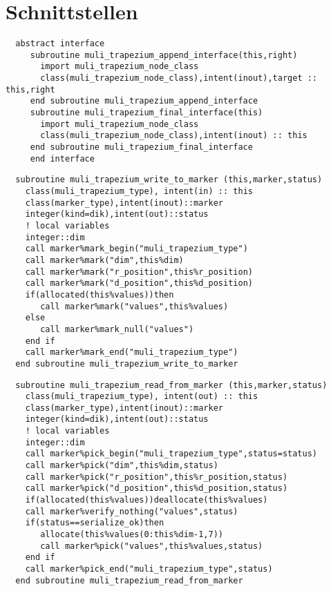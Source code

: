 \section{Schnittstellen}
\begin{Verbatim}
  abstract interface
     subroutine muli_trapezium_append_interface(this,right)
       import muli_trapezium_node_class
       class(muli_trapezium_node_class),intent(inout),target :: this,right
     end subroutine muli_trapezium_append_interface
     subroutine muli_trapezium_final_interface(this)
       import muli_trapezium_node_class
       class(muli_trapezium_node_class),intent(inout) :: this
     end subroutine muli_trapezium_final_interface
     end interface
   \end{Verbatim}
   \Methods
   \begin{Verbatim}
  subroutine muli_trapezium_write_to_marker (this,marker,status)
    class(muli_trapezium_type), intent(in) :: this
    class(marker_type),intent(inout)::marker
    integer(kind=dik),intent(out)::status
    ! local variables
    integer::dim
    call marker%mark_begin("muli_trapezium_type")
    call marker%mark("dim",this%dim)
    call marker%mark("r_position",this%r_position)
    call marker%mark("d_position",this%d_position)
    if(allocated(this%values))then
       call marker%mark("values",this%values)
    else
       call marker%mark_null("values")
    end if
    call marker%mark_end("muli_trapezium_type")
  end subroutine muli_trapezium_write_to_marker
\end{Verbatim}

\begin{Verbatim}
  subroutine muli_trapezium_read_from_marker (this,marker,status)
    class(muli_trapezium_type), intent(out) :: this
    class(marker_type),intent(inout)::marker
    integer(kind=dik),intent(out)::status
    ! local variables
    integer::dim
    call marker%pick_begin("muli_trapezium_type",status=status)
    call marker%pick("dim",this%dim,status)
    call marker%pick("r_position",this%r_position,status)
    call marker%pick("d_position",this%d_position,status)
    if(allocated(this%values))deallocate(this%values)
    call marker%verify_nothing("values",status)
    if(status==serialize_ok)then
       allocate(this%values(0:this%dim-1,7))
       call marker%pick("values",this%values,status)
    end if
    call marker%pick_end("muli_trapezium_type",status)
  end subroutine muli_trapezium_read_from_marker
\end{Verbatim}

